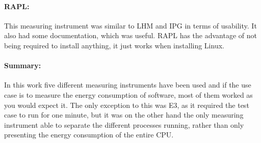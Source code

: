 \paragraph*{RAPL:} This measuring instrument was similar to LHM and IPG in terms of usability. It also had some documentation, which was useful. RAPL has the advantage of not being required to install anything, it just works when installing Linux.

\paragraph*{Summary:} In this work five different measuring instruments have been used and if the use case is to measure the energy consumption of software, most of them worked as you would expect it. The only exception to this was E3, as it required the test case to run for one minute, but it was on the other hand the only measuring instrument able to separate the different processes running, rather than only presenting the energy consumption of the entire CPU. 